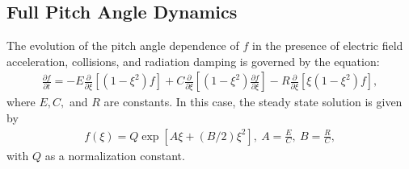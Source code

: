 \documentclass[final,leqno]{siamltex704}
\begin{document}
%
%



	


\subsection{Full Pitch Angle Dynamics}
The evolution of the pitch angle dependence of $f$ in the presence of electric field acceleration, collisions, and radiation damping is governed by the equation:
\begin{eqnarray}
\frac{\partial f}{\partial t}=-E\frac{\partial}{\partial\xi}[(1-\xi^2)f]+C\frac{\partial}{\partial\xi}[(1-\xi^2)\frac{\partial f}{\partial\xi}]-R\frac{\partial}{\partial\xi}[\xi(1-\xi^2)f],
\end{eqnarray}
where $E,C,$ and $R$ are constants. In this case, the steady state solution is given by
\begin{eqnarray}
f(\xi)=Q\exp[A\xi+(B/2)\xi^2],\ A=\frac{E}{C},\ B=\frac{R}{C},
\end{eqnarray}
with $Q$ as a normalization constant.
\end{document}
